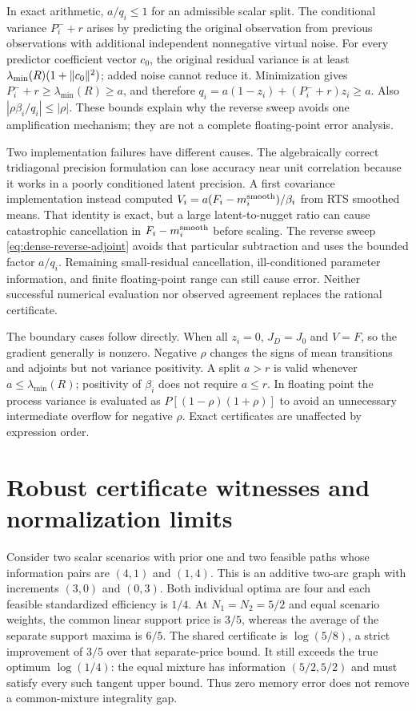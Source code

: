 In exact arithmetic, $a/q_i\le1$ for an admissible scalar split.
The conditional variance $P_i^-+r$ arises by predicting the original
observation from previous observations with additional independent
nonnegative virtual noise. For every predictor coefficient vector $c_0$,
the original residual variance is at least
$\lambda_{\min}(R)(1+\lVert c_0\rVert^2)$; added noise cannot reduce it.
Minimization gives $P_i^-+r\ge\lambda_{\min}(R)\ge a$, and therefore
$q_i=a(1-z_i)+(P_i^-+r)z_i\ge a$.
Also $|\rho\beta_i/q_i|\le|\rho|$.
These bounds explain why the reverse sweep avoids one amplification mechanism;
they are not a complete floating-point error analysis.

Two implementation failures have different causes. The algebraically
correct tridiagonal precision formulation can lose accuracy near unit
correlation because it works in a poorly conditioned latent precision.
A first covariance implementation instead computed
$V_i=a(F_i-m_i^{\rm smooth})/\beta_i$ from RTS smoothed means. That identity
is exact, but a large latent-to-nugget ratio can cause catastrophic
cancellation in $F_i-m_i^{\rm smooth}$ before scaling. The reverse sweep
\eqref{eq:dense-reverse-adjoint} avoids that particular subtraction and
uses the bounded factor $a/q_i$. Remaining small-residual cancellation,
ill-conditioned parameter information, and finite floating-point range can
still cause error. Neither successful numerical evaluation nor observed
agreement replaces the rational certificate.

The boundary cases follow directly. When all $z_i=0$, $J_D=J_0$ and $V=F$,
so the gradient generally is nonzero. Negative $\rho$ changes the signs of
mean transitions and adjoints but not variance positivity. A split $a>r$
is valid whenever $a\le\lambda_{\min}(R)$; positivity of $\beta_i$ does
not require $a\le r$. In floating point the process variance is evaluated
as $P[(1-\rho)(1+\rho)]$ to avoid an unnecessary intermediate overflow
for negative $\rho$. Exact certificates are unaffected by expression order.

\section{Robust certificate witnesses and normalization limits}
\label{app:robust-witnesses}

Consider two scalar scenarios with prior one and two feasible paths whose
information pairs are $(4,1)$ and $(1,4)$. This is an additive two-arc graph
with increments $(3,0)$ and $(0,3)$. Both individual optima are four and each
feasible standardized efficiency is $1/4$. At $N_1=N_2=5/2$ and equal
scenario weights, the common linear support price is $3/5$, whereas the
average of the separate support maxima is $6/5$. The shared certificate is
$\log(5/8)$, a strict improvement of $3/5$ over that separate-price bound.
It still exceeds the true optimum $\log(1/4)$: the equal mixture has
information $(5/2,5/2)$ and must satisfy every such tangent upper bound.
Thus zero memory error does not remove a common-mixture integrality gap.

